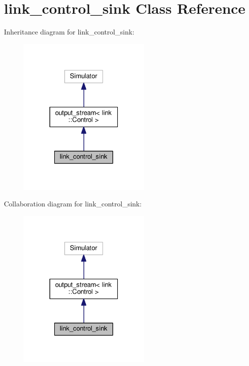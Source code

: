\hypertarget{classlink__control__sink}{}\section{link\+\_\+control\+\_\+sink Class Reference}
\label{classlink__control__sink}


Inheritance diagram for link\+\_\+control\+\_\+sink\+:\nopagebreak
\begin{figure}[H]
\begin{center}
\leavevmode
\includegraphics[width=183pt]{classlink__control__sink__inherit__graph}
\end{center}
\end{figure}


Collaboration diagram for link\+\_\+control\+\_\+sink\+:\nopagebreak
\begin{figure}[H]
\begin{center}
\leavevmode
\includegraphics[width=183pt]{classlink__control__sink__coll__graph}
\end{center}
\end{figure}
